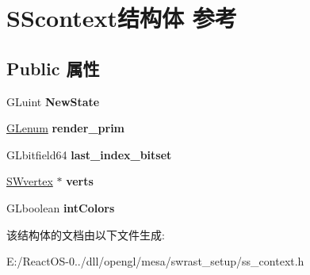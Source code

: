 \hypertarget{struct_s_scontext}{}\section{S\+Scontext结构体 参考}
\label{struct_s_scontext}
\subsection*{Public 属性}
\begin{DoxyCompactItemize}
\item 
\mbox{\label{struct_s_scontext_af370bf9424e94cab055996255cb566a4}} 
G\+Luint {\bfseries New\+State}
\item 
\mbox{\label{struct_s_scontext_a238930aba3b397e55aeb95f82ce703e2}} 
\hyperlink{interfacevoid}{G\+Lenum} {\bfseries render\+\_\+prim}
\item 
\mbox{\label{struct_s_scontext_ab648a7b5b627dca135de189e4a9ac8e4}} 
G\+Lbitfield64 {\bfseries last\+\_\+index\+\_\+bitset}
\item 
\mbox{\label{struct_s_scontext_af5b7b2099f5967c48f600b076bbd811d}} 
\hyperlink{struct_s_wvertex}{S\+Wvertex} $\ast$ {\bfseries verts}
\item 
\mbox{\label{struct_s_scontext_aff918cdbc4dffc95fac9d1ed7c81f9bd}} 
G\+Lboolean {\bfseries int\+Colors}
\end{DoxyCompactItemize}


该结构体的文档由以下文件生成\+:\begin{DoxyCompactItemize}
\item 
E\+:/\+React\+O\+S-\/0../dll/opengl/mesa/swrast\+\_\+setup/ss\+\_\+context.\+h\end{DoxyCompactItemize}
